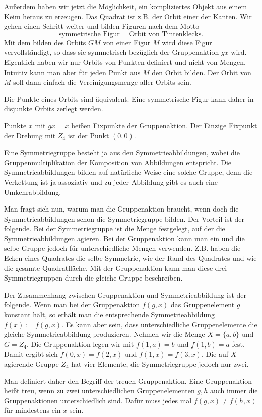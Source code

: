 \documentclass[a4paper,10pt,fleqn,twocolumn,twoside]{scrartcl}
\begin{document}
Außerdem haben wir jetzt die Möglichkeit, ein kompliziertes Objekt aus einem Keim heraus zu erzeugen. Das Quadrat ist z.B. der Orbit einer der Kanten. Wir gehen einen Schritt weiter und bilden Figuren nach dem Motto
\[\text{symmetrische Figur} = \text{Orbit von Tintenklecks}.\]
Mit dem bilden des Orbits $GM$ von einer Figur $M$ wird diese Figur vervollständigt, so dass sie symmetrisch bezüglich der Gruppenaktion $gx$ wird. Eigentlich haben wir nur Orbits von Punkten definiert und nicht von Mengen. Intuitiv kann man aber für jeden Punkt aus $M$ den Orbit bilden. Der Orbit von $M$ soll dann einfach die Vereinigungsmenge aller Orbits sein.

Die Punkte eines Orbits sind äquivalent. Eine symmetrische Figur kann daher in disjunkte Orbits zerlegt werden.

Punkte $x$ mit $gx=x$ heißen Fixpunkte der Gruppenaktion. Der Einzige Fixpunkt der Drehung mit $Z_4$ ist der Punkt $(0,0)$.

Eine Symmetriegruppe besteht ja aus den Symmetrieabbildungen, wobei die Gruppenmultiplikation der Komposition von Abbildungen entspricht. Die Symmetrieabbildungen bilden auf natürliche Weise eine solche Gruppe, denn die Verkettung ist ja assoziativ und zu jeder Abbildung gibt es auch eine Umkehrabbildung.

Man fragt sich nun, warum man die Gruppenaktion braucht, wenn doch die Symmetrieabbildungen schon die Symmetriegruppe bilden. Der Vorteil ist der folgende. Bei der Symmetriegruppe ist die Menge festgelegt, auf der die Symmetrieabbildungen agieren. Bei der Gruppenaktion kann man ein und die selbe Gruppe jedoch für unterschiedliche Mengen verwenden. Z.B. haben die Ecken eines Quadrates die selbe Symmetrie, wie der Rand des Quadrates und wie die gesamte Quadratfläche. Mit der Gruppenaktion kann man diese drei Symmetriegruppen durch die gleiche Gruppe beschreiben.

Der Zusammenhang zwischen Gruppenaktion und Symmetrieabbildung ist der folgende. Wenn man bei der Gruppenaktion $f(g,x)$ das Gruppenelement $g$ konstant hält, so erhält man die entsprechende Symmetrieabbildung $f(x):=f(g,x)$. Es kann aber sein, dass unterschiedliche Gruppenelemente die gleiche Symmetrieabbildung produzieren. Nehmen wir die Menge $X=\{a,b\}$ und $G=Z_4$. Die Gruppenaktion legen wir mit $f(1,a)=b$ und $f(1,b)=a$ fest. Damit ergibt sich $f(0,x)=f(2,x)$ und $f(1,x)=f(3,x)$. Die auf $X$ agierende Gruppe $Z_4$ hat vier Elemente, die Symmetriegruppe jedoch nur zwei.

Man definiert daher den Begriff der treuen Gruppenaktion. Eine Gruppenaktion heißt treu, wenn zu zwei unterschiedlichen Gruppenelementen $g,h$ auch immer die Gruppenaktionen unterschiedlich sind. Dafür muss jedes mal $f(g,x)\ne f(h,x)$ für mindestens ein $x$ sein.
\end{document}
